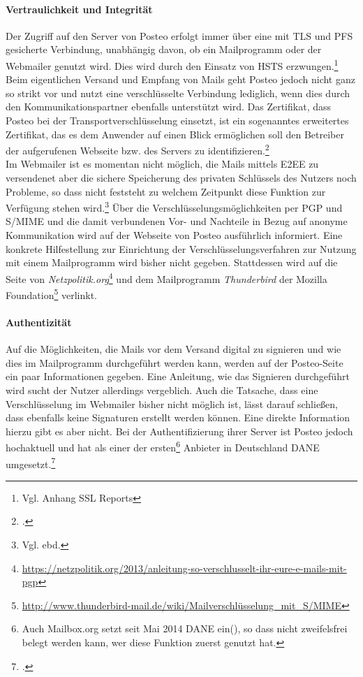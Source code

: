 \documentclass  [paper=a4,
				fontsize=12pt,
				listof=totoc,
				bibliography=totoc
				]{scrreprt}
\begin{document}
					\paragraph{Vertraulichkeit und Integrität}
						Der Zugriff auf den Server von Posteo erfolgt immer über eine mit \ac{TLS} und \ac{PFS} gesicherte Verbindung, unabhängig davon, ob ein Mailprogramm oder der Webmailer genutzt wird.
						Dies wird durch den Einsatz von \ac{HSTS} erzwungen.\footnote{Vgl. Anhang SSL Reports}
						Beim eigentlichen Versand und Empfang von Mails geht Posteo jedoch nicht ganz so strikt vor und nutzt eine verschlüsselte Verbindung lediglich, wenn dies durch den Kommunikationspartner ebenfalls unterstützt wird.
						Das Zertifikat, dass Posteo bei der Transportverschlüsselung einsetzt, ist ein sogenanntes erweitertes Zertifikat, das es dem Anwender auf einen Blick ermöglichen soll den Betreiber der aufgerufenen Webseite bzw. des Servers zu identifizieren.\footcite[Vgl.][]{Posteo2013c}\medskip\\
						Im Webmailer ist es momentan nicht möglich, die Mails mittels \ac{E2EE} zu versendenet aber die sichere Speicherung des privaten Schlüssels des Nutzers noch Probleme, so dass nicht feststeht zu welchem Zeitpunkt diese Funktion zur Verfügung stehen wird.\footnote{Vgl. ebd.}
						Über die Verschlüsselungsmöglichkeiten per \ac{PGP} und \ac{S/MIME} und die damit verbundenen Vor- und Nachteile in Bezug auf anonyme Kommunikation wird auf der Webseite von Posteo ausführlich informiert.
						Eine konkrete Hilfestellung zur Einrichtung der Verschlüsselungsverfahren zur Nutzung mit einem Mailprogramm wird bisher nicht gegeben.
						Stattdessen wird auf die Seite von \textit{Netzpolitik.org}\footnote{\url{https://netzpolitik.org/2013/anleitung-so-verschlusselt-ihr-eure-e-mails-mit-pgp}} und dem Mailprogramm \textit{Thunderbird} der Mozilla Foundation\footnote{\url{http://www.thunderbird-mail.de/wiki/Mailverschlüsselung_mit_S/MIME}} verlinkt.
					\newpage
					\paragraph{Authentizität}
						Auf die Möglichkeiten, die Mails vor dem Versand digital zu signieren und wie dies im Mailprogramm durchgeführt werden kann, werden auf der Posteo-Seite ein paar Informationen gegeben.
						Eine Anleitung, wie das Signieren durchgeführt wird sucht der Nutzer allerdings vergeblich.
						Auch die Tatsache, dass eine Verschlüsselung im Webmailer bisher nicht möglich ist, lässt darauf schließen, dass ebenfalls keine Signaturen erstellt werden können.
						Eine direkte Information hierzu gibt es aber nicht.
						Bei der Authentifizierung ihrer Server ist Posteo jedoch hochaktuell und hat als einer der ersten\footnote{Auch Mailbox.org setzt seit Mai 2014 \ac{DANE} ein(\cite[Vgl.][]{Mailbox2014a}), so dass nicht zweifelsfrei belegt werden kann, wer diese Funktion zuerst genutzt hat.} Anbieter in Deutschland \ac{DANE} umgesetzt.\footcite[Vgl.][]{Zivadino14e}
\end{document}
